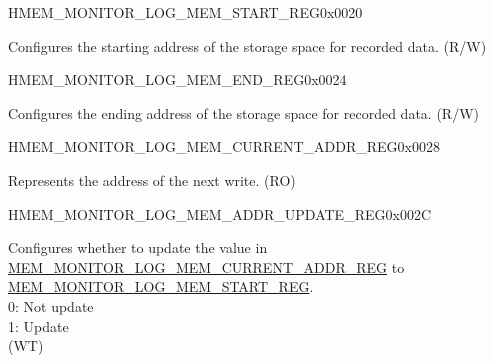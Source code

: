 \begin{register}{H}{MEM\_MONITOR\_LOG\_MEM\_START\_REG}{0x0020}\label{regdesc:MEMMONITORLOGMEMSTARTREG}
%
\regnewline%
\begin{regdesc}\begin{reglist}
\label{fielddesc:MEMMONITORLOGMEMSTART}\item [MEM\_MONITOR\_LOG\_MEM\_START] Configures the starting address of the storage space for recorded data. (R/W)
\end{reglist}\end{regdesc}
\end{register}


\begin{register}{H}{MEM\_MONITOR\_LOG\_MEM\_END\_REG}{0x0024}\label{regdesc:MEMMONITORLOGMEMENDREG}
%
\regnewline%
\begin{regdesc}\begin{reglist}
\label{fielddesc:MEMMONITORLOGMEMEND}\item [MEM\_MONITOR\_LOG\_MEM\_END] Configures the ending address of the storage space for recorded data. (R/W)
\end{reglist}\end{regdesc}
\end{register}


\begin{register}{H}{MEM\_MONITOR\_LOG\_MEM\_CURRENT\_ADDR\_REG}{0x0028}\label{regdesc:MEMMONITORLOGMEMCURRENTADDRREG}
%
\regnewline%
\begin{regdesc}\begin{reglist}
\label{fielddesc:MEMMONITORLOGMEMCURRENTADDR}\item [MEM\_MONITOR\_LOG\_MEM\_CURRENT\_ADDR] Represents the address of the next write. (RO)
\end{reglist}\end{regdesc}
\end{register}


\begin{register}{H}{MEM\_MONITOR\_LOG\_MEM\_ADDR\_UPDATE\_REG}{0x002C}\label{regdesc:MEMMONITORLOGMEMADDRUPDATEREG}
%
%
\regnewline%
\begin{regdesc}\begin{reglist}
\label{fielddesc:MEMMONITORLOGMEMADDRUPDATE}\item [MEM\_MONITOR\_LOG\_MEM\_ADDR\_UPDATE] Configures whether to update the value in \hyperref[regdesc:MEMMONITORLOGMEMCURRENTADDRREG]{MEM\_MONITOR\_LOG\_MEM\_CURRENT\_ADDR\_REG} to \hyperref[regdesc:MEMMONITORLOGMEMSTARTREG]{MEM\_MONITOR\_LOG\_MEM\_START\_REG}.\\
0: Not update \\
1: Update \\ (WT)
\end{reglist}\end{regdesc}
\end{register}


